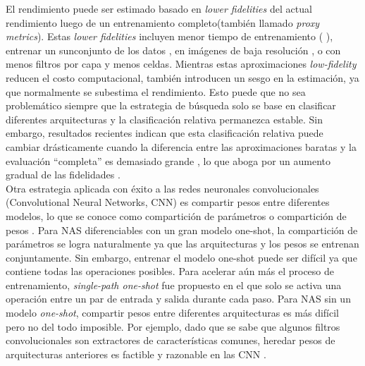 El rendimiento puede ser estimado basado en \textit{lower fidelities} del actual rendimiento luego de un entrenamiento completo(también llamado \textit{proxy metrics}). Estas \textit{lower fidelities} incluyen menor tiempo de entrenamiento (\parencite{56} \parencite{57}), entrenar un sunconjunto de los datos \parencite{58}, en imágenes de baja resolución \parencite{59}, o con menos filtros por capa y menos celdas. Mientras estas aproximaciones \textit{low-fidelity} reducen el costo computacional, también introducen un sesgo en la estimación, ya que normalmente se subestima el rendimiento. Esto puede que no sea problemático siempre que la estrategia de búsqueda solo se base en clasificar diferentes arquitecturas y la clasificación relativa permanezca estable. Sin embargo, resultados recientes indican que esta clasificación relativa puede cambiar drásticamente cuando la diferencia entre las aproximaciones baratas y la evaluación “completa” es demasiado grande \parencite{57}, lo que aboga por un aumento gradual de las fidelidades \parencite{60} \parencite{61}.\\

Otra estrategia aplicada con éxito a las redes neuronales convolucionales (Convolutional Neural Networks, CNN) es compartir pesos entre diferentes modelos, lo que se conoce como compartición de parámetros o compartición de pesos \parencite{62}. Para NAS diferenciables con un gran modelo one-shot, la compartición de parámetros se logra naturalmente ya que las arquitecturas y los pesos se entrenan conjuntamente. Sin embargo, entrenar el modelo one-shot puede ser difícil ya que contiene todas las operaciones posibles. Para acelerar aún más el proceso de entrenamiento, \textit{single-path one-shot} fue propuesto \parencite{63} en el que solo se activa una operación entre un par de entrada y salida durante cada paso. Para NAS sin un modelo \textit{one-shot}, compartir pesos entre diferentes arquitecturas es más difícil pero no del todo imposible. Por ejemplo, dado que se sabe que algunos filtros convolucionales son extractores de características comunes, heredar pesos de arquitecturas anteriores es factible y razonable en las CNN \parencite{64}. 



